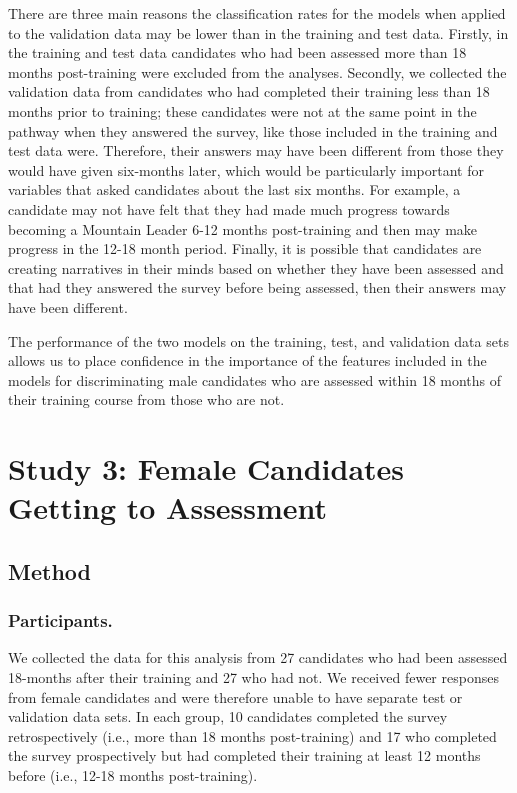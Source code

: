 \documentclass[
  12pt,
  a4paper,
]{book}
\begin{document}
There are three main reasons the classification rates for the models when applied to the validation data may be lower than in the training and test data. Firstly, in the training and test data candidates who had been assessed more than 18 months post-training were excluded from the analyses. Secondly, we collected the validation data from candidates who had completed their training less than 18 months prior to training; these candidates were not at the same point in the pathway when they answered the survey, like those included in the training and test data were. Therefore, their answers may have been different from those they would have given six-months later, which would be particularly important for variables that asked candidates about the last six months. For example, a candidate may not have felt that they had made much progress towards becoming a Mountain Leader 6-12 months post-training and then may make progress in the 12-18 month period. Finally, it is possible that candidates are creating narratives in their minds based on whether they have been assessed and that had they answered the survey before being assessed, then their answers may have been different.

The performance of the two models on the training, test, and validation data sets allows us to place confidence in the importance of the features included in the models for discriminating male candidates who are assessed within 18 months of their training course from those who are not.

\hypertarget{female-gta}{%
\section{Study 3: Female Candidates Getting to Assessment}\label{female-gta}}

\hypertarget{female-gta-method}{%
\subsection{Method}\label{female-gta-method}}

\hypertarget{female-gta-participants}{%
\subsubsection{Participants.}\label{female-gta-participants}}

We collected the data for this analysis from 27 candidates who had been assessed 18-months after their training and 27 who had not. We received fewer responses from female candidates and were therefore unable to have separate test or validation data sets. In each group, 10 candidates completed the survey retrospectively (i.e., more than 18 months post-training) and 17 who completed the survey prospectively but had completed their training at least 12 months before (i.e., 12-18 months post-training).
\end{document}
